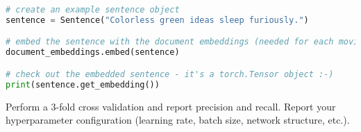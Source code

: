 \begin{enumerate}[label=\alph*)]
\begin{lstlisting}[language=Python, breaklines=true, caption=Embedding documents using flair]
# create an example sentence object
sentence = Sentence("Colorless green ideas sleep furiously.")

# embed the sentence with the document embeddings (needed for each movie review)
document_embeddings.embed(sentence)

# check out the embedded sentence - it's a torch.Tensor object :-)
print(sentence.get_embedding())
\end{lstlisting}
Perform a 3-fold cross validation and report precision and recall. Report your hyperparameter configuration (learning rate, batch size, network structure, etc.).\\\\



\pagebreak
{}



\end{enumerate}

